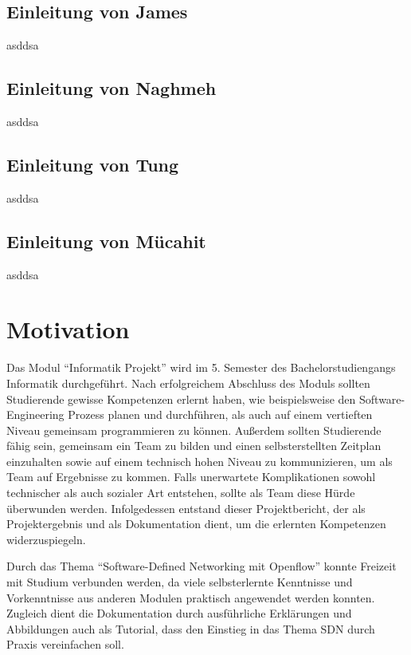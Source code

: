 \documentclass[fontsize=12pt,paper=a4,open=any,parskip=half,
  twoside=false,toc=listof,toc=bibliography,fleqn,leqno,
  captions=nooneline,captions=tableabove,british]{scrbook}
\begin{document}
\subsection{Einleitung von James}\label{einl-james}
asddsa
\subsection{Einleitung von Naghmeh}\label{einl-naghmeh}
asddsa
\subsection{Einleitung von Tung}\label{einl-tung}
asddsa
\subsection{Einleitung von Mücahit}\label{einl-müco}
asddsa

\section{Motivation}
Das Modul “Informatik Projekt” wird im 5. Semester des Bachelorstudiengangs Informatik durchgeführt. Nach erfolgreichem Abschluss des Moduls sollten Studierende gewisse Kompetenzen erlernt haben, wie beispielsweise den Software-Engineering Prozess planen und durchführen, als auch auf einem vertieften Niveau gemeinsam programmieren zu können. Außerdem sollten Studierende fähig sein, gemeinsam ein Team zu bilden und einen selbsterstellten Zeitplan einzuhalten sowie auf einem technisch hohen Niveau zu kommunizieren, um als Team auf Ergebnisse zu kommen. Falls unerwartete Komplikationen sowohl technischer als auch sozialer Art entstehen, sollte als Team diese Hürde überwunden werden. Infolgedessen entstand dieser Projektbericht, der als Projektergebnis und als Dokumentation dient, um die erlernten Kompetenzen widerzuspiegeln.\par
Durch das Thema “Software-Defined Networking mit Openflow” konnte Freizeit mit Studium verbunden werden, da viele selbsterlernte Kenntnisse und Vorkenntnisse aus anderen Modulen praktisch angewendet werden konnten. Zugleich dient die Dokumentation durch ausführliche Erklärungen und Abbildungen auch als Tutorial, dass den Einstieg in das Thema SDN durch Praxis vereinfachen soll.
\end{document}
